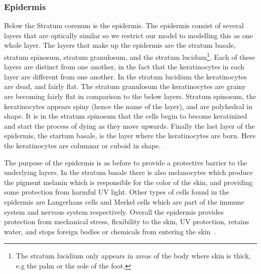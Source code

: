 \subsubsection*{Epidermis} %
\label{ssub:epidermis}

Below the Stratum corenum is the epidermis.
The epidermis consist of several layers that are optically similar so we restrict our model to modelling this as one whole layer.
The layers that make up the epidermis are the stratum basale, stratum spinosum, stratum granulosum, and the stratum lucidum\footnote{The stratum lucidium only appears in areas of the body where skin is thick, e.g the palm or the sole of the foot.}.
Each of these layers are distinct from one another, in the fact that the keratinocytes in each layer are different from one another.
In the stratum lucidium the keratinocytes are dead, and fairly flat.
The stratum granulosum the keratinocytes are grainy are becoming fairly flat in comparison to the below layers.
Stratum spinosum, the keratinocytes appears spiny (hence the name of the layer), and are polyhedral in shape.
It is in the stratum spinosum that the cells begin to become keratinized and start the process of dying as they move upwards.
Finally the last layer of the epidermis, the startum basale, is the layer where the keratinocytes are born.
Here the keratinocytes are columnar or cuboid in shape.

The purpose of the epidermis is as before to provide a protective barrier to the underlying layers. 
In the stratum basale there is also melanocytes which produce the pigment melanin which is responsible for the color of the skin, and providing some protection from harmful UV light. 
Other types of cells found in the epidermis are Langerhans cells and Merkel cells which are part of the immune system and nervous system respectively.
Overall the epidermis provides protection from mechanical stress, flexibility to the skin, UV protection, retains water, and stops foreign bodies or chemicals from entering the skin~\cite{freedberg1999fitzpatrick,zaidi2010dermatology}.


